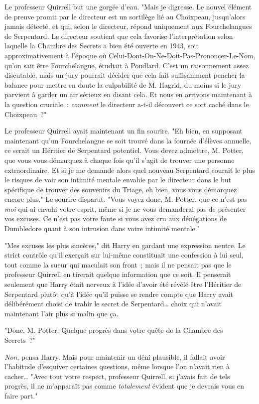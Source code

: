 Le professeur Quirrell but une gorgée d'eau. "Mais je digresse. Le nouvel élément de preuve promit par le directeur est un sortilège lié au Choixpeau, jusqu'alors jamais détecté, et qui, selon le directeur, répond uniquement aux Fourchelangues de Serpentard. Le directeur soutient que cela favorise l'interprétation selon laquelle la Chambre des Secrets a bien été ouverte en 1943, soit approximativement à l'époque où Celui-Dont-On-Ne-Doit-Pas-Prononcer-Le-Nom, qu'on sait être Fourchelangue, étudiait à Poudlard. C'est un raisonnement assez discutable, mais un jury pourrait décider que cela fait suffisamment pencher la balance pour mettre en doute la culpabilité de M. Hagrid, du moins si le jury parvient à garder un air sérieux en disant cela. Et nous en arrivons maintenant à la question cruciale~: \emph{comment} le directeur a-t-il découvert ce sort caché dans le Choixpeau~?"

Le professeur Quirrell avait maintenant un fin sourire. "Eh bien, en supposant maintenant qu'un Fourchelangue se soit trouvé dans la fournée d'élèves annuelle, ce serait un Héritier de Serpentard potentiel. Vous devez admettre, M. Potter, que vous vous démarquez à chaque fois qu'il s'agit de trouver une personne extraordinaire. Et si je me demande alors quel nouveau Serpentard courait le plus le risques de voir son intimité mentale envahie par le directeur dans le but spécifique de trouver des souvenirs du Triage, eh bien, vous vous démarquez encore plus." Le sourire disparut. "Vous voyez donc, M. Potter, que ce n'est pas \emph{moi} qui ai envahi votre esprit, même si je ne vous demanderai pas de présenter vos excuses. Ce n'est pas votre faute si vous avez cru aux dénégations de Dumbledore quant à son intrusion dans votre intimité mentale."

"Mes excuses les plus sincères," dit Harry en gardant une expression neutre. Le strict contrôle qu'il exerçait sur lui-même constituait une confession à lui seul, tout comme la sueur qui maculait son front~; mais il ne pensait pas que le professeur Quirrell en tirerait quelque information que ce soit. Il penserait seulement que Harry était nerveux à l'idée d'avoir été révélé être l'Héritier de Serpentard plutôt qu'à l'idée qu'il puisse se rendre compte que Harry avait délibérément choisi de trahir le secret de Serpentard… choix qui n'avait maintenant l'air plus si malin que ça.

"Donc, M. Potter. Quelque progrès dans votre quête de la Chambre des Secrets~?"

\emph{Non}, pensa Harry. Mais pour maintenir un déni plausible, il fallait avoir l'habitude d'esquiver certaines questions, même lorsque l'on n'avait rien à cacher… "Avec tout votre respect, professeur Quirrell, si j'avais fait de tels progrès, il ne m'apparaît pas comme \emph{totalement} évident que je devrais vous en faire part."

